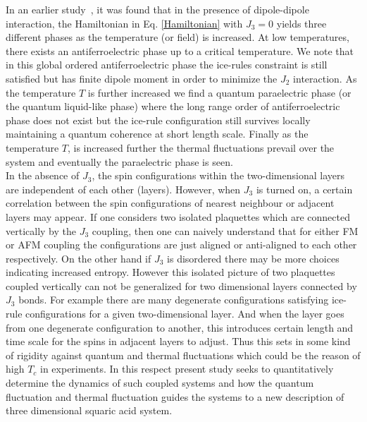\indent In an earlier study~\cite{vijigiri2020dipole}, it was found that in the presence of  dipole-dipole interaction, the Hamiltonian in Eq. \ref{Hamiltonian} with $J_3=0$ yields three different phases as the temperature (or field) is increased.  At low temperatures,   there exists an antiferroelectric phase up to a critical temperature. We note that in this global ordered antiferroelectric phase the ice-rules constraint is still satisfied but has finite dipole moment in order to minimize the $J_2$ interaction. As the temperature $T$ is further increased we find a quantum paraelectric phase (or the quantum liquid-like phase) where the long range order of antiferroelectric phase does not exist but the ice-rule configuration still survives locally maintaining a quantum coherence at short length scale. Finally as the temperature $T$, is increased further the thermal fluctuations prevail over the system and eventually the paraelectric phase is seen.  \\
\indent
In the absence of $J_3$, the spin configurations  within the two-dimensional layers are independent of each other (layers). However, when $J_3$ is turned on, a certain correlation between the spin configurations of  nearest neighbour or adjacent layers may appear.  If one considers two isolated plaquettes which are connected vertically by the $J_3$ coupling, then one can naively understand that for either FM or AFM coupling the configurations are just aligned or anti-aligned to each other respectively. On the other hand if $J_3$ is disordered there may be more choices indicating increased entropy. However this isolated picture of  two plaquettes coupled vertically can not be generalized for two dimensional layers connected by $J_3$ bonds. %
For example there are many degenerate configurations satisfying ice-rule configurations for a given two-dimensional layer. And when the layer goes from one degenerate configuration to another, this introduces certain length and time scale for the spins in adjacent layers to adjust. Thus this sets in some kind of rigidity against quantum and thermal fluctuations which could be the reason of high $T_c$ in experiments. In this respect present study seeks to quantitatively determine the dynamics of such coupled systems and how the quantum fluctuation and thermal fluctuation guides the systems to a new description of three dimensional squaric acid system.
